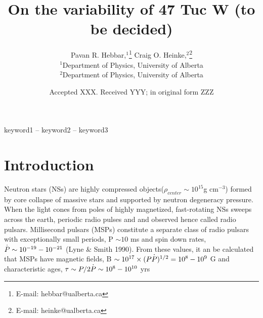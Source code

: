 \documentclass[a4paper,fleqn,usenatbib]{mnras}
\title[47 Tuc W]{On the variability of 47 Tuc W (to be decided)}
\author[Hebbar et al.]{
Pavan R. Hebbar,$^{1}$\thanks{E-mail: hebbar@ualberta.ca}
Craig O. Heinke,$^{2}$\thanks{E-mail: heinke@ualberta.ca}
\\
$^{1}$Department of Physics, University of Alberta\\
$^{2}$Department of Physics, University of Alberta\\
}
\date{Accepted XXX. Received YYY; in original form ZZZ}
\newcommand{\dispdot}[2][.2ex]{\dot{\raisebox{0pt}[\dimexpr\height+#1][\depth]{$#2$}}}%
\begin{document}
\label{firstpage}
\pagerange{\pageref{firstpage}--\pageref{lastpage}}
\maketitle

\begin{abstract}

\end{abstract}

\begin{keywords}
keyword1 -- keyword2 -- keyword3
\end{keywords}



\section{Introduction}

Neutron stars (NSs) are highly compressed objects($\rho_{center} \sim 10^{15}$g cm$^{-3}$) formed by core collapse of massive stars and supported by neutron degeneracy pressure. When the light cones from poles of highly magnetized, fast-rotating NSs sweeps across the earth, periodic radio pulses and and observed hence called radio pulsars. Millisecond pulsars
(MSPs) constitute a separate class of radio pulsars with exceptionally small periods, P $\sim 10$ ms and spin down rates, $\dispdot{P} \sim 10^{-19} - 10^{-21}$ (Lyne \& Smith 1990). From these values, it an be calculated that MSPs have magnetic fields, B $\sim 10^{17} \times (P \dispdot{P})^{1/2} = 10^{8} - 10^{9}$ G and characteristic ages, $\tau \sim P/2\dispdot{P} \sim 10^8 - 10^{10}$ yrs
\end{document}
